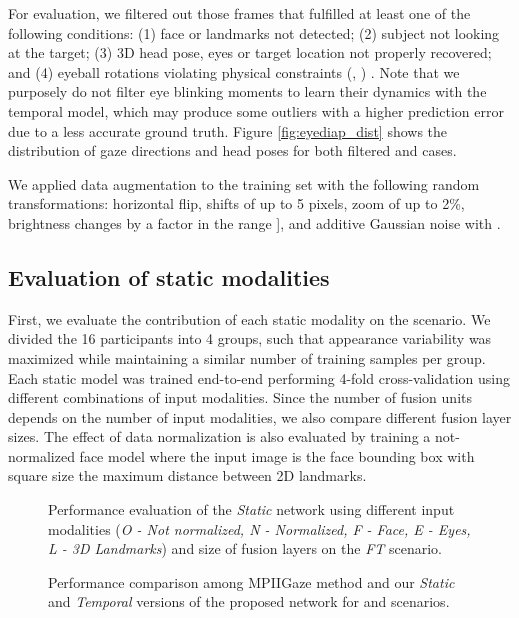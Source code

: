 \documentclass{bmvc2k}
\begin{document}
For evaluation, we filtered out those frames that fulfilled at least one of the following conditions: (1) face or landmarks not detected; (2) subject not looking at the target; (3) 3D head pose, eyes or target location not properly recovered; and (4) eyeball rotations violating physical constraints (, ) \cite{msccirc}. Note that we purposely do not filter eye blinking moments to learn their dynamics with the temporal model, which may produce some outliers with a higher prediction error due to a less accurate ground truth. Figure \ref{fig:eyediap_dist} shows the distribution of gaze directions and head poses for both filtered  and  cases.

We applied data augmentation to the training set with the following random transformations:  horizontal flip, shifts of up to 5 pixels, zoom of up to 2\%, brightness changes by a factor in the range ], and additive Gaussian noise with .

\subsection{Evaluation of static modalities}

First, we evaluate the contribution of each static modality on the  scenario. We divided the 16 participants into 4 groups, such that appearance variability was maximized while maintaining a similar number of training samples per group. Each static model was trained end-to-end performing 4-fold cross-validation using different combinations of input modalities. Since the number of fusion units depends on the number of input modalities, we also compare different fusion layer sizes. The effect of data normalization is also evaluated by training a not-normalized face model where the input image is the face bounding box with square size the maximum distance between 2D landmarks. 

\begin{figure}
	\begin{minipage}{.48\columnwidth}
		\centering
		\caption{Performance evaluation of the \textit{Static} network using different input modalities (\textit{O - Not normalized, N - Normalized, F - Face, E - Eyes, L - 3D Landmarks}) and size of fusion layers on the \textit{FT} scenario.}
		\label{fig:static_comparison}
	\end{minipage}
	\hspace{.03\columnwidth}
\begin{minipage}{.48\columnwidth}
		\centering
		\caption{Performance comparison among MPIIGaze method \cite{zhang2015appearance} and our \textit{Static} and \textit{Temporal} versions of the proposed network for  and  scenarios.}
		\label{fig:sota_comparison}
	\end{minipage}
\end{figure}
\end{document}
